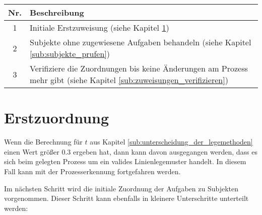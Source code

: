 \begin{center}
	\label{tab:relationserkennung-basis}
	\begin{tabularx}
		{1.0\linewidth}{ c X } \textbf{Nr.} & \textbf{Beschreibung} \\
		\hline 1 & Initiale Erstzuweisung (siehe Kapitel \ref{sub:erstzuordnung}) \\
		\hline 2 & Subjekte ohne zugewiesene Aufgaben behandeln (siehe Kapitel \ref{sub:subjekte_prufen}) \\
		\hline 3 & Verifiziere die Zuordnungen bis keine Änderungen am Prozess mehr gibt (siehe Kapitel \ref{sub:zuweisungen_verifizieren})\\
	\end{tabularx}
\end{center}

\section{Erstzuordnung} %
\label{sub:erstzuordnung}
Wenn die Berechnung für $t$ aus Kapitel \ref{sub:unterscheidung_der_legemethoden} einen Wert größer $0.3$ ergeben hat, dann kann davon ausgegangen werden, dass es sich beim gelegten Prozess um ein valides Linienlegemuster handelt. In diesem Fall kann mit der Prozesserkennung fortgefahren werden.

Im nächsten Schritt wird die initiale Zuordnung der Aufgaben zu Subjekten vorgenommen. Dieser Schritt kann ebenfalls in kleinere Unterschritte unterteilt werden:
 
